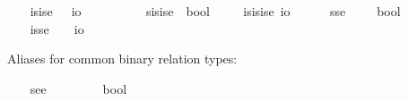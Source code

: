 \begin{isabellebody}
\ \ \isamarkupfalse%
\ isise\ {\isacharequal}\ \ {\isachardoublequoteopen}{\isacharparenleft}{\isasymup}{\isasymlangle}{\isasymzero}{\isasymrangle}{\isasymRightarrow}io{\isacharparenright}{\isachardoublequoteclose}\ \ \ \ \ \ {\isacharparenleft}{\isachardoublequoteopen}{\isasymup}{\isasymlangle}{\isasymup}{\isasymlangle}{\isasymzero}{\isasymrangle}{\isasymrangle}{\isachardoublequoteclose}{\isacharparenright}\isanewline
\ \ \isamarkupfalse%
\ sisise{\isacharequal}\ \ {\isachardoublequoteopen}{\isacharparenleft}{\isasymup}{\isasymlangle}{\isasymup}{\isasymlangle}{\isasymzero}{\isasymrangle}{\isasymrangle}{\isasymRightarrow}bool{\isacharparenright}{\isachardoublequoteclose}\ {\isacharparenleft}{\isachardoublequoteopen}{\isasymlangle}{\isasymup}{\isasymlangle}{\isasymup}{\isasymlangle}{\isasymzero}{\isasymrangle}{\isasymrangle}{\isasymrangle}{\isachardoublequoteclose}{\isacharparenright}\isanewline
\ \ \isamarkupfalse%
\ isisise{\isacharequal}\ {\isachardoublequoteopen}{\isacharparenleft}{\isasymup}{\isasymlangle}{\isasymup}{\isasymlangle}{\isasymzero}{\isasymrangle}{\isasymrangle}{\isasymRightarrow}io{\isacharparenright}{\isachardoublequoteclose}\ \ {\isacharparenleft}{\isachardoublequoteopen}{\isasymup}{\isasymlangle}{\isasymup}{\isasymlangle}{\isasymup}{\isasymlangle}{\isasymzero}{\isasymrangle}{\isasymrangle}{\isasymrangle}{\isachardoublequoteclose}{\isacharparenright}\isanewline
\ \ \isamarkupfalse%
\ sse\ {\isacharequal}\ \ \ \ {\isachardoublequoteopen}{\isasymlangle}{\isasymzero}{\isasymrangle}{\isasymRightarrow}bool{\isachardoublequoteclose}\ \ \ \ \ \ \ \ \ {\isacharparenleft}{\isachardoublequoteopen}{\isasymlangle}{\isasymlangle}{\isasymzero}{\isasymrangle}{\isasymrangle}{\isachardoublequoteclose}{\isacharparenright}\isanewline
\ \ \isamarkupfalse%
\ isse\ {\isacharequal}\ \ \ {\isachardoublequoteopen}{\isasymlangle}{\isasymzero}{\isasymrangle}{\isasymRightarrow}io{\isachardoublequoteclose}\ \ \ \ \ \ \ \ \ \ {\isacharparenleft}{\isachardoublequoteopen}{\isasymup}{\isasymlangle}{\isasymlangle}{\isasymzero}{\isasymrangle}{\isasymrangle}{\isachardoublequoteclose}{\isacharparenright}%
\begin{isamarkuptext}%
Aliases for common binary relation types:%
\end{isamarkuptext}\isamarkuptrue%
\ \ \isamarkupfalse%
\ see\ {\isacharequal}\ \ \ \ \ \ \ \ {\isachardoublequoteopen}{\isacharparenleft}{\isasymzero}{\isasymRightarrow}{\isasymzero}{\isasymRightarrow}bool{\isacharparenright}{\isachardoublequoteclose}\ \ \ \ \ \ \ \ \ \ {\isacharparenleft}{\isachardoublequoteopen}{\isasymlangle}{\isasymzero}{\isacharcomma}{\isasymzero}{\isasymrangle}{\isachardoublequoteclose}{\isacharparenright}\isanewline

\end{isabellebody}
